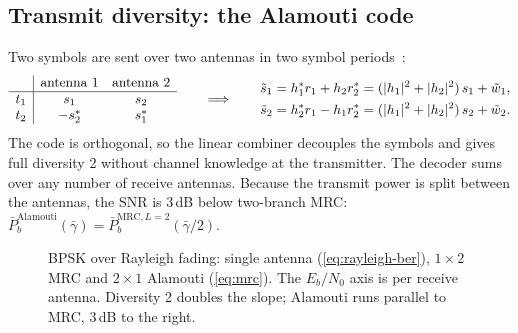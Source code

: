 \subsection{Transmit diversity: the Alamouti code}
Two symbols are sent over two antennas in two symbol periods~\cite{alamouti1998}:
\begin{equation}
  \begin{array}{c|cc}
    & \text{antenna 1} & \text{antenna 2}\\ \hline
    t_1 & s_1 & s_2\\
    t_2 & -s_2^{*} & s_1^{*}
  \end{array}
  \qquad\Longrightarrow\qquad
  \begin{aligned}
    \tilde s_1&=h_1^{*} r_1+h_2r_2^{*}=(|h_1|^2+|h_2|^2)\,s_1+\tilde w_1,\\
    \tilde s_2&=h_2^{*} r_1-h_1r_2^{*}=(|h_1|^2+|h_2|^2)\,s_2+\tilde w_2 .
  \end{aligned}
\end{equation}
The code is orthogonal, so the linear combiner decouples the symbols and gives full diversity
2 without channel knowledge at the transmitter. The decoder sums over any number of receive
antennas. Because the transmit power is split between the antennas, the SNR is $3$\,dB below
two-branch MRC: $\bar P_b^{\text{Alamouti}}(\bar\gamma)=\bar P_b^{\text{MRC},L=2}(\bar\gamma/2)$.

\begin{figure}[htbp]
\centering
{}
\caption{BPSK over Rayleigh fading: single antenna (\cref{eq:rayleigh-ber}), $1\times2$ MRC and
$2\times1$ Alamouti (\cref{eq:mrc}). The $E_b/N_0$ axis is per receive antenna. Diversity 2
doubles the slope; Alamouti runs parallel to MRC, 3\,dB to the right.}
\label{fig:diversity}
\end{figure}

